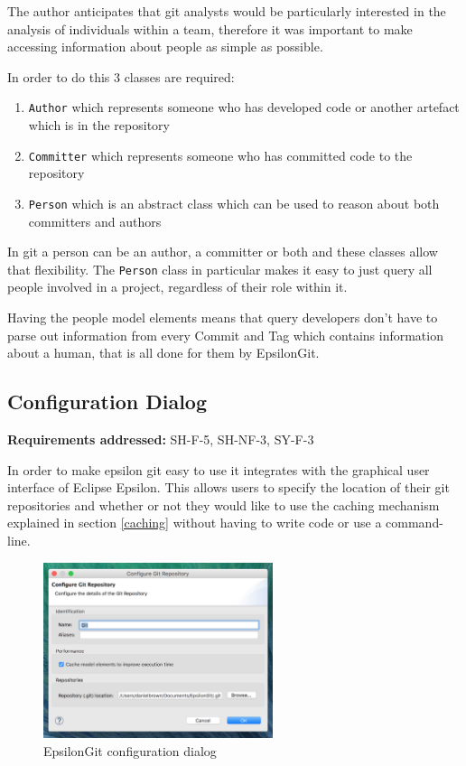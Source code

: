 \documentclass[11pt]{book}
\newcommand{\code}[1]{\texttt{#1}}
\begin{document}
The author anticipates that git analysts would be particularly interested in the analysis of individuals within a team, therefore it was important to make accessing information about people as simple as possible. 

In order to do this 3 classes are required:
\begin{enumerate}
	\item \code{Author} which represents someone who has developed code or another artefact which is in the repository
	\item \code{Committer} which represents someone who has committed code to the repository
	\item \code{Person} which is an abstract class which can be used to reason about both committers and authors
\end{enumerate}

In git a person can be an author, a committer or both and these classes allow that flexibility. The \code{Person} class in particular makes it easy to just query all people involved in a project, regardless of their role within it.

Having the people model elements means that query developers don't have to parse out information from every Commit and Tag which contains information about a human, that is all done for them by EpsilonGit.

\clearpage

\subsection{Configuration Dialog}
\begin{tcolorbox}
\textbf{Requirements addressed:} SH-F-5, SH-NF-3, SY-F-3
\end{tcolorbox}

In order to make epsilon git easy to use it integrates with the graphical user interface of Eclipse Epsilon. This allows users to specify the location of their git repositories and whether or not they would like to use the caching mechanism explained in section \ref{caching} without having to write code or use a command-line.

\begin{figure}[h]
	\centering
	\includegraphics[width=0.6\textwidth]{images/configurationdialog}
	\caption{EpsilonGit configuration dialog}
	\label{fig:configurationdialog}
\end{figure}
\end{document}
